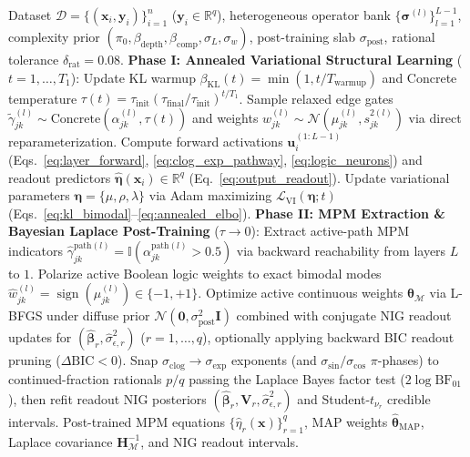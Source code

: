 \documentclass[11pt,a4paper]{article}
\begin{document}
\begin{algorithm}[t!]
\caption{Two-Phase Variational Structural Learning and Bayesian Laplace Post-Training for \texttt{Symbolic-LBBNN}}
\label{alg:symbolic_lbbnn}
\begin{algorithmic}[1]
\Require Dataset $\mathcal{D} = \{(\bm{x}_i, \bm{y}_i)\}_{i=1}^n$ ($\bm{y}_i \in \mathbb{R}^q$), heterogeneous operator bank $\{\bm{\sigma}^{(l)}\}_{l=1}^{L-1}$, complexity prior $(\pi_0, \beta_{\text{depth}}, \beta_{\text{comp}}, \sigma_L, \sigma_w)$, post-training slab $\sigma_{\text{post}}$, rational tolerance $\delta_{\text{rat}} = 0.08$.
\State \textbf{Phase I: Annealed Variational Structural Learning} ($t = 1, \dots, T_1$):
  \State Update KL warmup $\beta_{\text{KL}}(t) = \min(1, t/T_{\text{warmup}})$ and Concrete temperature $\tau(t) = \tau_{\text{init}}(\tau_{\text{final}}/\tau_{\text{init}})^{t/T_1}$.
  \State Sample relaxed edge gates $\tilde{\gamma}_{jk}^{(l)} \sim \mathrm{Concrete}(\alpha_{jk}^{(l)}, \tau(t))$ and weights $w_{jk}^{(l)} \sim \mathcal{N}(\mu_{jk}^{(l)}, s_{jk}^{2(l)})$ via direct reparameterization.
  \State Compute forward activations $\bm{u}_i^{(1:L-1)}$ (Eqs.~\eqref{eq:layer_forward}, \eqref{eq:clog_exp_pathway}, \eqref{eq:logic_neurons}) and readout predictors $\hat{\bm{\eta}}(\bm{x}_i) \in \mathbb{R}^q$ (Eq.~\eqref{eq:output_readout}).
  \State Update variational parameters $\bm{\eta} = \{\mu, \rho, \lambda\}$ via Adam maximizing $\mathcal{L}_{\text{VI}}(\bm{\eta}; t)$ (Eqs.~\eqref{eq:kl_bimodal}--\eqref{eq:annealed_elbo}).
\EndFor
\State \textbf{Phase II: MPM Extraction \& Bayesian Laplace Post-Training} ($\tau \to 0$):
\State Extract active-path MPM indicators $\hat{\gamma}_{jk}^{\text{path}(l)} = \mathbb{I}(\alpha_{jk}^{\text{path}(l)} > 0.5)$ via backward reachability from layers $L$ to $1$.
\State Polarize active Boolean logic weights to exact bimodal modes $\hat{w}_{jk}^{(l)} = \operatorname{sign}(\mu_{jk}^{(l)}) \in \{-1, +1\}$.
\State Optimize active continuous weights $\bm{\theta}_{\mathcal{M}}$ via L-BFGS under diffuse prior $\mathcal{N}(\bm{0}, \sigma_{\text{post}}^2 \bm{I})$ combined with conjugate NIG readout updates for $(\hat{\bm{\beta}}_r, \hat{\sigma}_{\epsilon,r}^2)$ ($r = 1, \dots, q$), optionally applying backward BIC readout pruning ($\Delta\mathrm{BIC} < 0$).
\State Snap $\sigma_{\text{clog}} \to \sigma_{\exp}$ exponents (and $\sigma_{\sin}/\sigma_{\cos}$ $\pi$-phases) to continued-fraction rationals $p/q$ passing the Laplace Bayes factor test ($2\log\mathrm{BF}_{01}$), then refit readout NIG posteriors $(\hat{\bm{\beta}}_r, \bm{V}_r, \hat{\sigma}_{\epsilon,r}^2)$ and Student-$t_{\nu_r}$ credible intervals.
\Ensure Post-trained MPM equations $\{\hat{\eta}_r(\bm{x})\}_{r=1}^q$, MAP weights $\hat{\bm{\theta}}_{\text{MAP}}$, Laplace covariance $\bm{H}_{\mathcal{M}}^{-1}$, and NIG readout intervals.
\end{algorithmic}
\end{algorithm}
\end{document}
